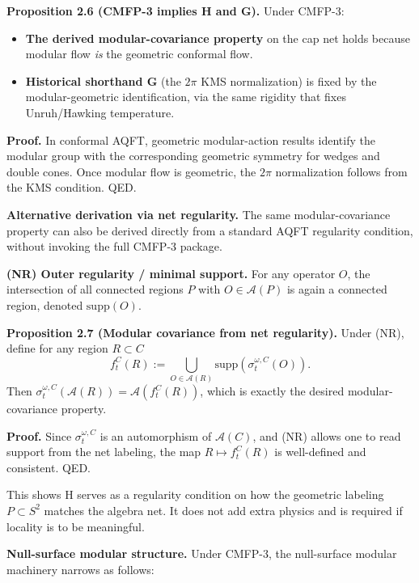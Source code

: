 \textbf{Proposition 2.6 (CMFP-3 implies H and G).} Under CMFP-3:

\begin{itemize}
\tightlist
\item
\textbf{The derived modular-covariance property} on the cap net holds because modular flow \emph{is} the geometric conformal flow.
\item
\textbf{Historical shorthand G} (the \(2\pi\) KMS normalization) is fixed by the modular-geometric identification, via the same rigidity that fixes Unruh/Hawking temperature.
\end{itemize}

\textbf{Proof.} In conformal AQFT, geometric modular-action results identify the modular group with the corresponding geometric symmetry for wedges and double cones. Once modular flow is geometric, the \(2\pi\) normalization follows from the KMS condition. QED.

\textbf{Alternative derivation via net regularity.} The same modular-covariance property can also be derived directly from a standard AQFT regularity condition, without invoking the full CMFP-3 package.

\textbf{(NR) Outer regularity / minimal support.} For any operator \(O\), the intersection of all connected regions \(P\) with \(O \in \mathcal{A}(P)\) is again a connected region, denoted \(\mathrm{supp}(O)\).

\textbf{Proposition 2.7 (Modular covariance from net regularity).} Under (NR), define for any region \(R \subset C\)
\[
f_t^C(R) := \bigcup_{O \in \mathcal{A}(R)} \mathrm{supp}\left(\sigma_t^{\omega,C}(O)\right).
\]
Then \(\sigma_t^{\omega,C}(\mathcal{A}(R)) = \mathcal{A}(f_t^C(R))\), which is exactly the desired modular-covariance property.

\textbf{Proof.} Since \(\sigma_t^{\omega,C}\) is an automorphism of \(\mathcal{A}(C)\), and (NR) allows one to read support from the net labeling, the map \(R \mapsto f_t^C(R)\) is well-defined and consistent. QED.

This shows H serves as a regularity condition on how the geometric labeling \(P \subset S^2\) matches the algebra net. It does not add extra physics and is required if locality is to be meaningful.

\textbf{Null-surface modular structure.} Under CMFP-3, the null-surface modular machinery narrows as follows:

